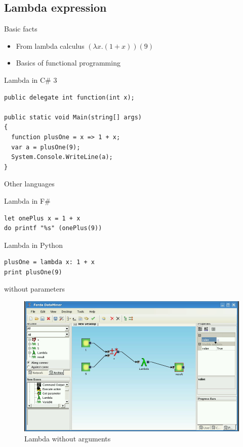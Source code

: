 \documentclass[a4paper,12pt]{book}
\begin{document}
\subsection{Lambda expression}
Basic facts
\begin{itemize}
	\item From lambda calculus $(\lambda x.(1+x))(9)$
	\item Basics of functional programming
\end{itemize}

Lambda in C\# 3
\begin{verbatim}
public delegate int function(int x);

public static void Main(string[] args)
{
  function plusOne = x => 1 + x;
  var a = plusOne(9);
  System.Console.WriteLine(a);
}
\end{verbatim}
	
Other languages

Lambda in F\#
\begin{verbatim}
let onePlus x = 1 + x
do printf "%s" (onePlus(9)) 
\end{verbatim}

Lambda in Python
\begin{verbatim}
plusOne = lambda x: 1 + x
print plusOne(9)
\end{verbatim}

without parameters
\begin{figure}
\includegraphics[width=13.72cm]{lambdaBasic2.png}
	\caption{Lambda without arguments}
\end{figure}
\end{document}

